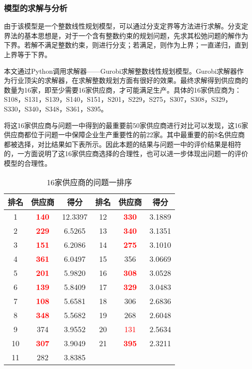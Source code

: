 \documentclass[withoutpreface,bwprint]{cumcmthesis} %
\begin{document}
\subsubsection{模型的求解与分析}
由于该模型是一个整数线性规划模型，可以通过分支定界等方法进行求解。分支定界法的基本思想是，对于一个含有整数约束的规划问题，先求其松弛问题的解作为下界。若解不满足整数约束，则进行分支；若满足，则作为上界；一直递归，直到上界等于下界。

本文通过Python调用求解器——Gurobi求解整数线性规划模型。Gurobi求解器作为行业顶尖的求解器，在求解整数规划方面有很好的效果。最终求解得到供应商的数量为16家，即至少需要16家供应商，才可能满足生产。具体的16家供应商为：S108，S131，S139，S140，S151，S201，S229，S275，S307，S308，S329，S330，S340，S348，S361，S395。

将这16家供应商与问题一中得到的最重要前50家供应商进行对比可以发现，这16家供应商都位于问题一中保障企业生产重要性的前22家。其中最重要的前8名供应商都被选择，对比结果如下表所示。因此本题的结果与问题一中的评价结果是相符的，一方面说明了这16家供应商选择的合理性，也可以进一步体现出问题一的评价模型的合理性。

\begin{table}[h]
    \caption{16家供应商的问题一排序}\label{tab005} \centering
    \centering
    \begin{tabular}{|c|c|c|c|c|c|}
    \hline
    排名 & 供应商 & 得分 & 排名 & 供应商 & 得分 \\ \hline
        1 & \textcolor{red}{\textbf{140}} & 12.3397 & 12 & \textcolor{red}{\textbf{330}} & 3.1889 \\ \hline
        2 & \textcolor{red}{\textbf{229}} & 6.5265 & 13 & \textcolor{red}{\textbf{340}} & 3.1351 \\ \hline
        3 & \textcolor{red}{\textbf{151}} & 6.2086 & 14 & \textcolor{red}{\textbf{275}} & 3.1010 \\ \hline
        4 & \textcolor{red}{\textbf{361}} & 6.0497 & 15 & 356 & 3.0669 \\ \hline
        5 & \textcolor{red}{\textbf{201}} & 5.9820 & 16 & \textcolor{red}{\textbf{308}} & 3.0528 \\ \hline
        6 & \textcolor{red}{\textbf{139}}& 5.8409 & 17 & \textcolor{red}{\textbf{329}} & 3.0483 \\ \hline
        7 & \textcolor{red}{\textbf{108}} & 5.6581 & 18 & 306 & 2.6836 \\ \hline
        8 & \textcolor{red}{\textbf{348}} & 5.5682 & 19 & 268 & 2.6048 \\ \hline
        9 & 374 & 3.9552 & 20 & \textcolor{red}{131} & 2.5634 \\ \hline
        10 & \textcolor{red}{\textbf{307}} & 3.9049 & 21 & \textcolor{red}{\textbf{395}} & 2.3211 \\ \hline
        11 & 282 & 3.8385 &  &  &  \\ \hline
    \end{tabular}
\end{table}
\end{document}

